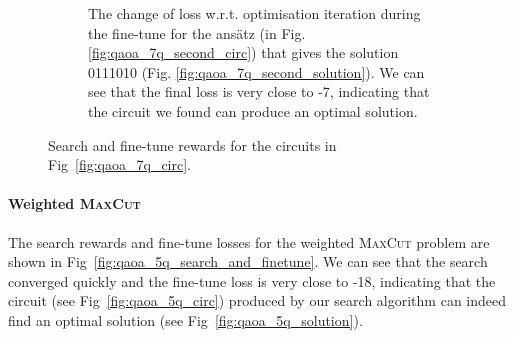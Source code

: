 \documentclass{ieeeaccess}
\begin{document}
\begin{figure}[ht!]
\begin{subfigure}[b]{0.48\linewidth}
        \caption{The change of loss w.r.t. optimisation iteration during the fine-tune for the ans\"atz (in Fig.\ref{fig:qaoa_7q_second_circ}) that gives the solution 0111010 (Fig. \ref{fig:qaoa_7q_second_solution}). We can see that the final loss is very close to -7, indicating that the circuit we found can produce an optimal solution.}
        \label{fig:qaoa_finetune_2}
    \end{subfigure}
    \caption{Search and fine-tune rewards for the circuits in Fig~\ref{fig:qaoa_7q_circ}. }\label{fig:qaoa_7q_search_finetune_both}
\end{figure}

\paragraph{Weighted \textsc{MaxCut}}
The search rewards and fine-tune losses for the weighted \textsc{MaxCut} problem are shown in Fig~\ref{fig:qaoa_5q_search_and_finetune}. We can see that the search converged quickly and the fine-tune loss is very close to -18, indicating that the circuit (see Fig~\ref{fig:qaoa_5q_circ}) produced by our search algorithm can indeed find an optimal solution (see Fig~\ref{fig:qaoa_5q_solution}).
\end{document}
